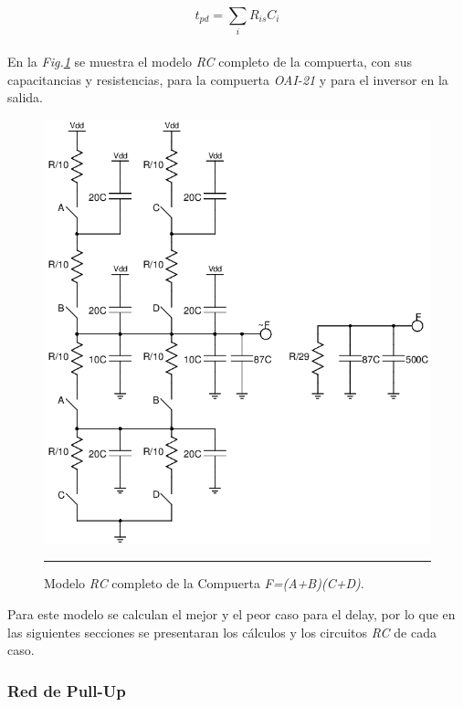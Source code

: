 \documentclass[12pt,a4paper]{article} %
\begin{document}
\begin{equation}\label{eqn:Elmore}
t_{pd} = \sum_{i} R_{is}C_{i}
\end{equation}\\



En la \textit{Fig.\ref{fig:ModeloRC_Completo}} se muestra el modelo \textit{RC} completo de la compuerta, con sus capacitancias y resistencias, para la compuerta \textit{OAI-21} y para el inversor en la salida.\\

\begin{figure}[htbp]
  \centering
    \includegraphics[scale=0.45]{./ModeloRC_Completo.png}
    \rule{35em}{0.5pt}
  \caption[IdealvsSim]{Modelo \textit{RC} completo de la Compuerta \textit{F=(A+B)(C+D)}.}
  \label{fig:ModeloRC_Completo}
\end{figure}

Para este modelo se calculan el mejor y el peor caso para el delay, por lo que en las siguientes secciones se presentaran los cálculos y los circuitos \textit{RC} de cada caso.\\

\subsubsection{Red de Pull-Up}
\end{document}
